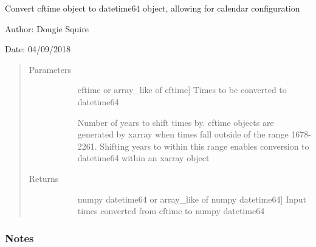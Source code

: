 \documentclass[letterpaper,10pt,english]{sphinxmanual}
\begin{document}
\begin{fulllineitems}
\end{fulllineitems}


\begin{fulllineitems}
\label{\detokenize{utils_doc:utils.cftime_to_datetime64}}
Convert cftime object to datetime64 object, allowing for  calendar configuration

\begin{DUlineblock}{0em}
\item[] Author: Dougie Squire
\item[] Date: 04/09/2018
\end{DUlineblock}
\begin{quote}\begin{description}
\item[{Parameters}] \leavevmode\begin{description}
\item[{}] \leavevmode{[}cftime or array\_like of cftime{]}
Times to be converted to datetime64

\item[{}] \leavevmode
Number of years to shift times by. cftime objects are generated by xarray when times fall                     outside of the range 1678-2261. Shifting years to within this range enables conversion to                     datetime64 within an xarray object

\end{description}

\item[{Returns}] \leavevmode\begin{description}
\item[{}] \leavevmode{[}numpy datetime64 or array\_like of numpy datetime64{]}
Input times converted from cftime to numpy datetime64

\end{description}

\end{description}\end{quote}
\subsubsection*{Notes}


\end{fulllineitems}
\end{document}
